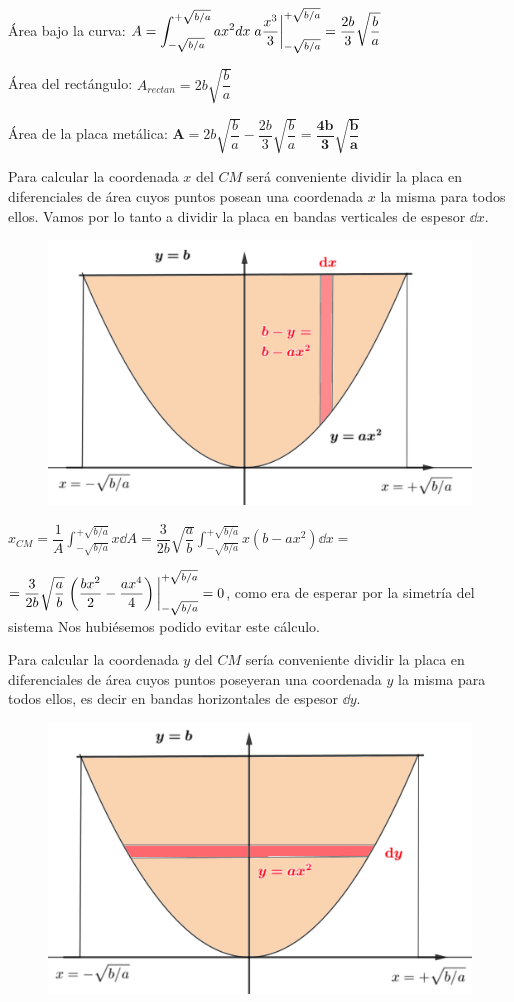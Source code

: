Área bajo la curva:
$\displaystyle A=\int_{-\sqrt{b/a}}^{+\sqrt{b/a}} ax^2 dx \eval{a \dfrac {x^3}{3}}_{-\sqrt{b/a}}^{+\sqrt{b/a}}=\dfrac {2b}{3}\sqrt{\dfrac{b}{a}}$

Área del rectángulo: $A_{rectan}=2b\sqrt{\dfrac b a}$

Área de la placa metálica: $\boldsymbol{A}=2b\sqrt{\dfrac b a}- \dfrac{2b}3 \sqrt{\dfrac b a}=\boldsymbol{\dfrac{4b}{3} \sqrt{\dfrac b a}}$

\begin{multicols}{2}
Para calcular la coordenada $x$ del $CM$ será conveniente dividir la placa en diferenciales de área cuyos puntos posean una coordenada $x$ la misma para todos ellos. Vamos por lo tanto a dividir la placa en bandas verticales de espesor $\dd x$. 
\begin{figure}[H]
	\centering
	\includegraphics[width=.4\textwidth]{imagenes/imagenes12/T12IM08.png}
\end{figure}
\end{multicols}

$\displaystyle x_{CM}=\dfrac 1 A \int_{-\sqrt{b/a}}^{+\sqrt{b/a}} x \dd A = \dfrac {3}{2b} \sqrt{\dfrac a b} \int_{-\sqrt{b/a}}^{+\sqrt{b/a}} x(b-ax^2) \dd x = $

$=\dfrac {3}{2b} \sqrt{\dfrac a b}\eval{\left( \dfrac {bx^2}{2} - \dfrac  {ax^4}{4} \right) }_{-\sqrt{b/a}}^{+\sqrt{b/a}} = 0$, como era de esperar por la simetría del sistema \textcolor{gris}{Nos hubiésemos podido evitar este cálculo.}

\begin{multicols}{2}
Para calcular la coordenada $y$ del $CM$ sería conveniente dividir la placa en diferenciales de área cuyos puntos poseyeran una coordenada $y$ la misma para todos ellos, es decir en bandas horizontales de espesor $\dd y$. 
\begin{figure}[H]
	\centering
	\includegraphics[width=.4\textwidth]{imagenes/imagenes12/T12IM09.png}
\end{figure}
\end{multicols}

